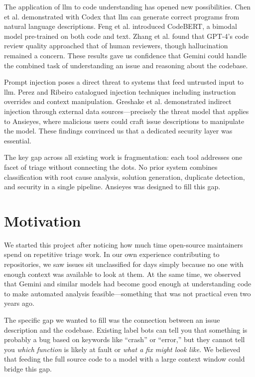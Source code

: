 The application of \gls{llm} to code understanding has opened new possibilities. Chen et al. \cite{Chen2021} demonstrated with Codex that \gls{llm} can generate correct programs from natural language descriptions. Feng et al. \cite{Feng2020} introduced CodeBERT, a bimodal model pre-trained on both code and text. Zhang et al. \cite{Zhang2023} found that GPT-4's code review quality approached that of human reviewers, though hallucination remained a concern. These results gave us confidence that Gemini could handle the combined task of understanding an issue and reasoning about the codebase.

Prompt injection poses a direct threat to systems that feed untrusted input to \gls{llm}. Perez and Ribeiro \cite{Perez2022} catalogued injection techniques including instruction overrides and context manipulation. Greshake et al. \cite{Greshake2023} demonstrated indirect injection through external data sources---precisely the threat model that applies to Ansieyes, where malicious users could craft issue descriptions to manipulate the model. These findings convinced us that a dedicated security layer was essential.

The key gap across all existing work is fragmentation: each tool addresses one facet of triage without connecting the dots. No prior system combines classification with root cause analysis, solution generation, duplicate detection, and security in a single pipeline. Ansieyes was designed to fill this gap.

\section{Motivation}

We started this project after noticing how much time open-source maintainers spend on repetitive triage work. In our own experience contributing to repositories, we saw issues sit unclassified for days simply because no one with enough context was available to look at them. At the same time, we observed that Gemini and similar models had become good enough at understanding code to make automated analysis feasible---something that was not practical even two years ago.

The specific gap we wanted to fill was the connection between an issue description and the codebase. Existing label bots can tell you that something is probably a bug based on keywords like ``crash'' or ``error,'' but they cannot tell you \textit{which function} is likely at fault or \textit{what a fix might look like}. We believed that feeding the full source code to a model with a large context window could bridge this gap.

